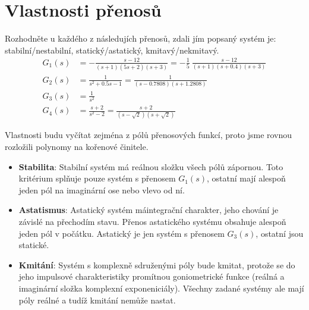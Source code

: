\documentclass[twoside]{article}
\begin{document}
\section{Vlastnosti přenosů}
\label{sec:ukol8}
Rozhodněte u každého z následujích přenosů, zdali jím popsaný systém je: stabilní/nestabilní, statický/astatický, kmitavý/nekmitavý.
\begin{equation*}
	\begin{split}
		G_1(s) &= -\frac{s-12}{(s+1)(5s+2)(s+3)} = -\frac{1}{5}~\frac{s-12}{(s+1)(s+0.4)(s+3)} \\
		G_2(s) &= \frac{1}{s^2 + 0.5s - 1} = \frac{1}{(s-0.7808)(s+1.2808)} \\
		G_3(s) &= \frac{1}{s^2} \\
		G_4(s) &= \frac{s+2}{s^2-2} = \frac{s+2}{(s-\sqrt{2})(s+\sqrt{2})}
	\end{split}
\end{equation*}

Vlastnosti budu vyčítat zejména z pólů přenosových funkcí, proto jsme rovnou rozložili polynomy na kořenové činitele.

\begin{itemize}
	\item \textbf{Stabilita}: Stabilní systém má reálnou složku všech pólů zápornou. Toto kritérium splňuje pouze systém s přenosem $G_1(s)$,
	ostatní mají alespoň jeden pól na imaginární ose nebo vlevo od ní.
	\item \textbf{Astatismus}: Astatický systém máintegrační charakter, jeho chování je závislé na přechodím stavu. Přenos astatického 
	systému obsahuje alespoň jeden pól v počátku. Astatický je jen systém s přenosem $G_3(s)$, ostatní jsou statické.
	\item \textbf{Kmitání}: Systém s komplexně sdruženými póly bude kmitat, protože se do jeho impulsové charakteristiky promítnou goniometrické funkce
	(reálná a imaginární složka komplexní exponeniciály). Všechny zadané systémy ale mají póly reálné a tudíž kmitání nemůže nastat.
\end{itemize}
\end{document}
